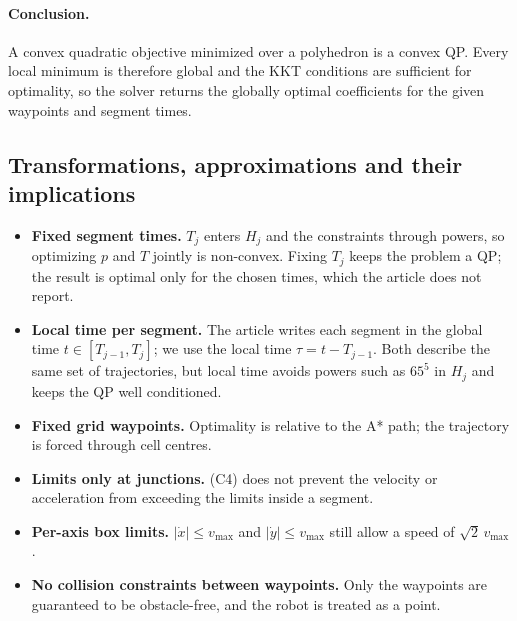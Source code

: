 \paragraph{Conclusion.} A convex quadratic objective minimized over a polyhedron is a convex QP. Every local minimum is therefore global and the KKT conditions are sufficient for optimality, so the solver returns the globally optimal coefficients for the given waypoints and segment times.

\subsection{Transformations, approximations and their implications}
\begin{itemize}
\item \textbf{Fixed segment times.} $T_j$ enters $H_j$ and the constraints through powers, so optimizing $p$ and $T$ jointly is non-convex. Fixing $T_j$ keeps the problem a QP; the result is optimal only for the chosen times, which the article does not report.
\item \textbf{Local time per segment.} The article writes each segment in the global time $t\in[T_{j-1},T_j]$; we use the local time $\tau = t - T_{j-1}$. Both describe the same set of trajectories, but local time avoids powers such as $65^5$ in $H_j$ and keeps the QP well conditioned.
\item \textbf{Fixed grid waypoints.} Optimality is relative to the A* path; the trajectory is forced through cell centres.
\item \textbf{Limits only at junctions.} (C4) does not prevent the velocity or acceleration from exceeding the limits inside a segment.
\item \textbf{Per-axis box limits.} $|\dot{x}|\le v_{\max}$ and $|\dot{y}|\le v_{\max}$ still allow a speed of $\sqrt{2}\,v_{\max}$.
\item \textbf{No collision constraints between waypoints.} Only the waypoints are guaranteed to be obstacle-free, and the robot is treated as a point.
\end{itemize}

